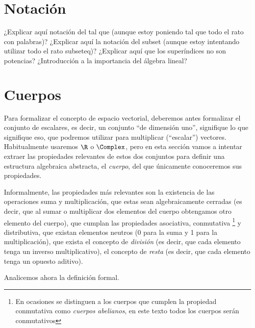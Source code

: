 \documentclass[../algebra_lineal.tex]{subfiles}
\begin{document}
\section{Notación}

¿Explicar aquí notación del tal que (aunque estoy poniendo tal que todo el rato con palabras)? ¿Explicar aquí la notación del subset (aunque estoy intentando utilizar todo el rato subseteq)? ¿Explicar aquí que los superíndices no son potencias? ¿Introducción a la importancia del álgebra lineal?

\section{Cuerpos}

Para formalizar el concepto de espacio vectorial, deberemos antes formalizar el conjunto de escalares, es decir, un conjunto ``de dimensión uno'', signifique lo que signifique eso, que podremos utilizar para multiplicar (``escalar'') vectores. Habitualmente usaremos $\R$ o $\Complex$, pero en esta sección vamos a intentar extraer las propiedades relevantes de estos dos conjuntos para definir una estructura algebraica abstracta, el \textit{cuerpo}, del que únicamente conoceremos sus propiedades.

Informalmente, las propiedades más relevantes son la existencia de las operaciones suma y multiplicación, que estas sean algebraicamente cerradas
(es decir, que al sumar o multiplicar dos elementos del cuerpo obtengamos otro elemento del cuerpo), que cumplan las propiedades asociativa, conmutativa
\footnote{En ocasiones se distinguen a los cuerpos que cumplen la propiedad conmutativa como \textit{cuerpos abelianos}, en este texto todos los cuerpos
 serán conmutativos} y distributiva, que existan elementos neutros (0 para la suma y 1 para la multiplicación), que exista el concepto de \textit{división} (es decir, que cada elemento tenga un inverso multiplicativo), el concepto de \textit{resta} (es decir, que cada elemento tenga un opuesto aditivo).

Analicemos ahora la definición formal.
\end{document}
